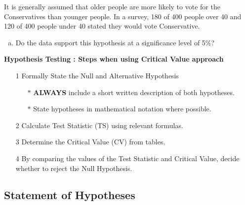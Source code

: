 \documentclass[a4paper,12pt]{article}
\begin{document}
\large 
\noindent It is generally assumed that older people are more likely to vote for the Conservatives than younger people. In a survey, 180 of 400 people over 40 and 120 of 400 people under 40 stated they would vote Conservative. 
\begin{enumerate}[(a)]
\item Do the data support this hypothesis at a significance level of 5\%?
\end{enumerate}

\bigskip 

\begin{framed}
		\noindent \textbf{Hypothesis Testing : Steps when using Critical Value approach}
		
		\begin{itemize}
			\item[1] Formally State the Null and Alternative Hypothesis \smallskip
			{
				\begin{itemize}
					\item[$\ast$] \textbf{ALWAYS} include a short written description of both hypotheses.
					\item[$\ast$] State hypotheses in mathematical notation where possible.
					
				\end{itemize}
			}
			\item[2] Calculate Test Statistic (TS) using relevant formulas.\smallskip
			\item[3] Determine the Critical Value (CV) from tables. \smallskip
			\item[4] By comparing the values of the Test Statistic and Critical Value, decide whether to reject the Null Hypothesis.
		\end{itemize}
	\end{framed}
\newpage 
\subsection*{Statement of Hypotheses}
\end{document}
